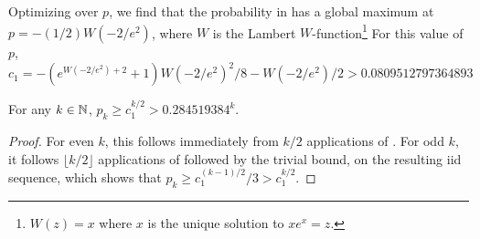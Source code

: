 \documentclass{patmorin}
\begin{document}
Optimizing over $p$, we find that the probability in
 has a global maximum at $p=-(1/2)W(-2/e^2)$,
where $W$ is the Lambert $W$-function\footnote{$W(z)=x$ where $x$ is
the unique solution to $xe^x = z$.} For this value of $p$,
\[
c_1 = -{\left(e^{{W}(-2/e^2) + 2} + 1\right)} {W}(-2/e^2)^{2}/8 - {W}(-2/e^2)/2
>
0.0809512797364893
\]

\begin{thm}
   For any $k\in\mathbb{N}$, $p_{k} \ge c_1^{k/2} > 0.284519384^k$.
\end{thm}

\begin{proof}
  For even $k$, this follows immediately from $k/2$ applications of
  . For odd $k$, it follows $\lfloor k/2\rfloor$
  applications of  followed by the trivial bound,
  on the resulting iid sequence, which shows that 
  $p_{k}\ge c_1^{(k-1)/2}/3 > c_1^{k/2}$.
\end{proof}

%
%
%
%
%
%
%
\end{document}
